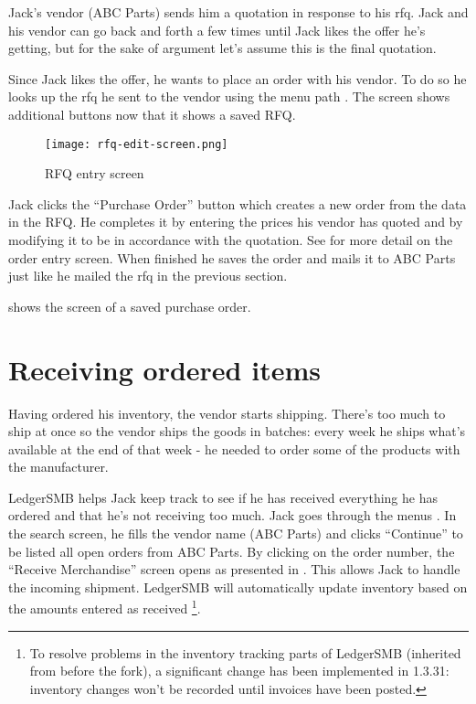 Jack's vendor (ABC Parts) sends him a quotation in response to his \gls{rfq}. Jack and his vendor
can go back and forth a few times until Jack likes the offer he's getting, but for the sake of
argument let's assume this is the final quotation.

Since Jack likes the offer, he wants to place an order with his vendor. To do so he looks up the
\gls{rfq} he sent to the vendor using the menu path .
The screen shows additional buttons now that it shows a saved RFQ.


\begin{figure}[h]
\centering
\texttt{[image: rfq-edit-screen.png]}
\caption{RFQ entry screen}
\label{fig:bus-rfq-edit-screen}
\end{figure}

Jack clicks the ``Purchase Order'' button which creates a new order from the data in the RFQ.
He completes it
by entering the prices his vendor has quoted and by modifying it to be in accordance with the
quotation. See  for more
detail on the order entry screen. When finished he saves the order and mails it to
ABC Parts just like he mailed the \gls{rfq} in the previous section.

 shows the screen of a saved purchase order.

\section{Receiving ordered items}
\label{sec-stock-receiving}

Having ordered his inventory, the vendor starts shipping. There's too much to ship at once
so the vendor ships the goods in batches: every week he ships what's available at the end
of that week - he needed to order some of the products with the manufacturer.

LedgerSMB helps Jack keep track to see if he has received everything he has ordered and
that he's not receiving too much. Jack goes through the menus .
In the search screen, he fills the vendor name (ABC Parts) and clicks ``Continue'' to be listed
all open orders from ABC Parts. By clicking on the order number, the ``Receive Merchandise'' screen
opens as presented in . This allows Jack to handle the incoming
shipment. LedgerSMB will automatically update inventory based on the amounts entered as received
\footnote{To resolve problems in the inventory tracking parts of LedgerSMB (inherited from
before the fork), a significant change has been implemented in 1.3.31: inventory changes won't
be recorded until invoices have been posted.
}.


